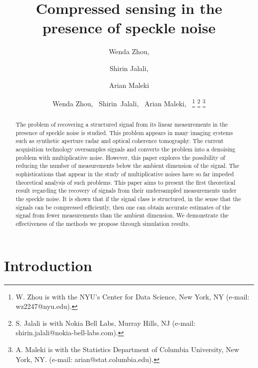 \documentclass[onecolumn]{IEEEtran}
\title{Compressed sensing  in the presence of speckle noise}
\author{}
\begin{document}
\author{Wenda Zhou, \and Shirin Jalali, \and Arian Maleki}

\author{Wenda Zhou,~\IEEEmembership{}
  Shirin~Jalali,~\IEEEmembership{}
Arian Maleki,~\IEEEmembership{}
                   \thanks{W. Zhou is with the NYU’s Center for Data Science, New York, NY (e-mail: wz2247@nyu.edu).}
           \thanks{S. Jalali is with Nokia Bell Labs, Murray Hills, NJ  (e-mail: shirin.jalali@nokia-bell-labs.com).}
           \thanks{A. Maleki is with the Statistics Department of Columbia University, New York, NY. (e-mail: arian@stat.columbia.edu).}}



\maketitle
\begin{abstract}
The problem of recovering a structured signal from its linear measurements in the presence of speckle noise is studied. This problem appears in many imaging systems such as synthetic aperture radar and optical coherence tomography. The current acquisition technology oversamples  signals and converts the problem into a denoising problem with multiplicative noise. However, this paper explores the possibility of reducing the number of measurements below the ambient dimension of the signal. The sophistications that appear in the study of multiplicative noises have so far impeded  theoretical analysis of such problems. This paper aims to present the first theoretical result regarding the recovery of signals from their undersampled measurements under the speckle noise. It is shown that if the signal class is structured, in the sense that the signals can be compressed efficiently, then one can obtain accurate estimates of the signal from fewer measurements than the ambient dimension. We demonstrate the effectiveness of the methods we propose through simulation results.  
\end{abstract}

\section{Introduction}
\end{document}
